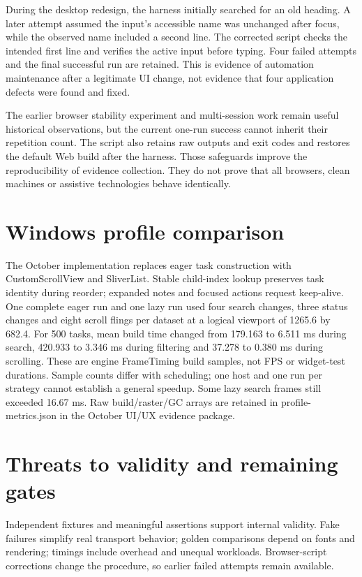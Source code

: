 \documentclass[12pt,a4paper,oneside]{report}
\begin{document}
During the desktop redesign, the harness initially searched for an old heading. A later attempt assumed the input's accessible name was unchanged after focus, while the observed name included a second line. The corrected script checks the intended first line and verifies the active input before typing. Four failed attempts and the final successful run are retained. This is evidence of automation maintenance after a legitimate UI change, not evidence that four application defects were found and fixed.

The earlier browser stability experiment and multi-session work remain useful historical observations, but the current one-run success cannot inherit their repetition count. The script also retains raw outputs and exit codes and restores the default Web build after the harness. Those safeguards improve the reproducibility of evidence collection. They do not prove that all browsers, clean machines or assistive technologies behave identically.

\section{Windows profile comparison}
The October implementation replaces eager task construction with CustomScrollView and SliverList. Stable child-index lookup preserves task identity during reorder; expanded notes and focused actions request keep-alive. One complete eager run and one lazy run used four search changes, three status changes and eight scroll flings per dataset at a logical viewport of 1265.6 by 682.4. For 500 tasks, mean build time changed from 179.163 to 6.511 ms during search, 420.933 to 3.346 ms during filtering and 37.278 to 0.380 ms during scrolling. These are engine FrameTiming build samples, not FPS or widget-test durations. Sample counts differ with scheduling; one host and one run per strategy cannot establish a general speedup. Some lazy search frames still exceeded 16.67 ms. Raw build/raster/GC arrays are retained in profile-metrics.json in the October UI/UX evidence package.

\section{Threats to validity and remaining gates}
Independent fixtures and meaningful assertions support internal validity. Fake failures simplify real transport behavior; golden comparisons depend on fonts and rendering; timings include overhead and unequal workloads. Browser-script corrections change the procedure, so earlier failed attempts remain available.
\end{document}
